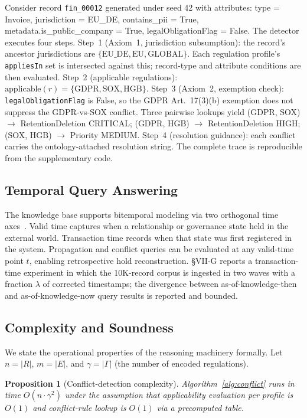 \documentclass{ieeeaccess}
\newtheorem{proposition}{Proposition}
\begin{document}
Consider record \texttt{fin\_00012} generated under seed 42 with attributes: type = Invoice, jurisdiction = EU\_DE, contains\_pii = True, metadata.is\_public\_company = True, legalObligationFlag = False. The detector executes four steps. Step~1 (Axiom~1, jurisdiction subsumption): the record's ancestor jurisdictions are $\{\mathrm{EU\_DE, EU, GLOBAL}\}$. Each regulation profile's \texttt{appliesIn} set is intersected against this; record-type and attribute conditions are then evaluated. Step~2 (applicable regulations): $\mathrm{applicable}(r) = \{\mathrm{GDPR, SOX, HGB}\}$. Step~3 (Axiom~2, exemption check): \texttt{legalObligationFlag} is False, so the GDPR Art.~17(3)(b) exemption does not suppress the GDPR-vs-SOX conflict. Three pairwise lookups yield (GDPR, SOX) $\rightarrow$ RetentionDeletion CRITICAL; (GDPR, HGB) $\rightarrow$ RetentionDeletion HIGH; (SOX, HGB) $\rightarrow$ Priority MEDIUM. Step~4 (resolution guidance): each conflict carries the ontology-attached resolution string. The complete trace is reproducible from the supplementary code.

\subsection{Temporal Query Answering}

The knowledge base supports bitemporal modeling via two orthogonal time axes~\cite{snodgrass1995,jensen1997}. Valid time captures when a relationship or governance state held in the external world. Transaction time records when that state was first registered in the system. Propagation and conflict queries can be evaluated at any valid-time point $t$, enabling retrospective hold reconstruction. §VII-G reports a transaction-time experiment in which the 10K-record corpus is ingested in two waves with a fraction $\lambda$ of corrected timestamps; the divergence between as-of-knowledge-then and as-of-knowledge-now query results is reported and bounded.

\subsection{Complexity and Soundness}

We state the operational properties of the reasoning machinery formally. Let $n = |R|$, $m = |E|$, and $\gamma = |\Gamma|$ (the number of encoded regulations).

\begin{proposition}[Conflict-detection complexity]
Algorithm~\ref{alg:conflict} runs in time $O(n \cdot \gamma^2)$ under the assumption that applicability evaluation per profile is $O(1)$ and conflict-rule lookup is $O(1)$ via a precomputed table.
\end{proposition}
\end{document}
